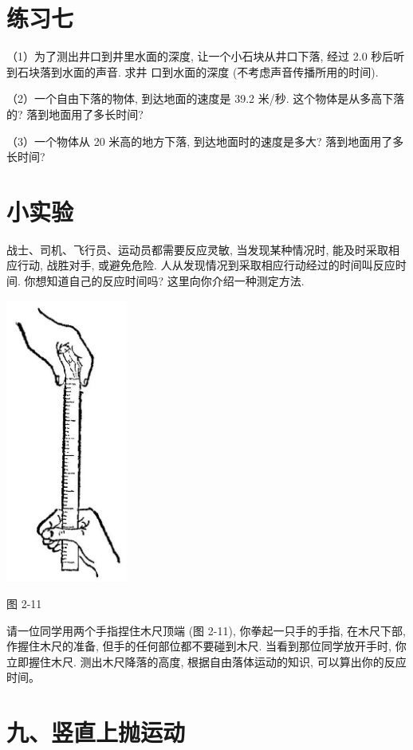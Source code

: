\documentclass[10pt]{article}
\begin{document}
\section*{练习七}

（1）为了测出井口到井里水面的深度, 让一个小石块从井口下落, 经过 2.0 秒后听到石块落到水面的声音. 求井 口到水面的深度 (不考虑声音传播所用的时间).

（2）一个自由下落的物体, 到达地面的速度是 39.2 米/秒. 这个物体是从多高下落的? 落到地面用了多长时间?

（3）一个物体从 20 米高的地方下落, 到达地面时的速度是多大? 落到地面用了多长时间?

\section*{小实验}

战士、司机、飞行员、运动员都需要反应灵敏, 当发现某种情况时, 能及时采取相应行动, 战胜对手, 或避免危险. 人从发现情况到采取相应行动经过的时间叫反应时间. 你想知道自己的反应时间吗? 这里向你介绍一种测定方法.

\begin{center}
\includegraphics[max width=0.3\textwidth]{images/01912d55-147c-70aa-b0e0-1782a122f948_81_829601.jpg}
\end{center}

图 2-11

请一位同学用两个手指捏住木尺顶端 (图 2-11), 你拳起一只手的手指, 在木尺下部, 作握住木尺的准备, 但手的任何部位都不要碰到木尺. 当看到那位同学放开手时, 你立即握住木尺. 测出木尺降落的高度, 根据自由落体运动的知识, 可以算出你的反应时间。

\section*{九、竖直上抛运动}
\end{document}
